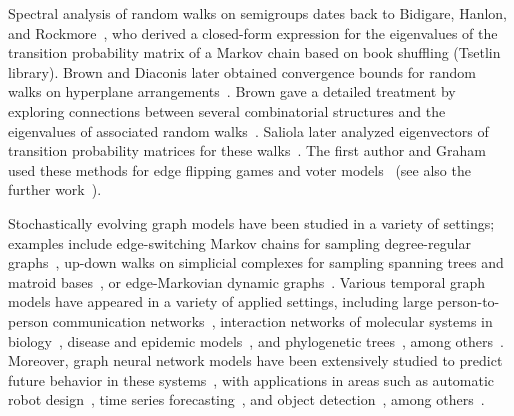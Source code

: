 \documentclass[11pt,a4paper]{article}
\begin{document}

Spectral analysis of random walks on semigroups dates back to Bidigare, Hanlon, and Rockmore~\cite{bidigare1999combinatorial}, who derived a closed-form expression for the eigenvalues of the transition probability matrix of a Markov chain based on book shuffling (Tsetlin library). Brown and Diaconis later obtained convergence bounds for random walks on hyperplane arrangements~\cite{brown1998random}. Brown gave a detailed treatment by exploring connections between several combinatorial structures and the eigenvalues of associated random walks~\cite{brownSemigroupsRingsMarkov2000}. Saliola later analyzed eigenvectors of transition probability matrices for these walks~\cite{saliola2012eigenvectors}. The first author and Graham used these methods for edge flipping games and voter models~\cite{chungEdgeFlippingGraphs2012} (see also the further work~\cite{butlerEdgeFlippingComplete2015,demirci2023mixing,chung2012hypergraph}).

Stochastically evolving graph models have been studied in a variety of settings; examples include edge-switching Markov chains for sampling degree-regular graphs~\cite{cooper2007sampling}, up-down walks on simplicial complexes for sampling spanning trees and matroid bases~\cite{anari2019log}, or edge-Markovian dynamic graphs~\cite{clementi2008flooding, akrida2020fast}. Various temporal graph models have appeared in a variety of applied settings, including large person-to-person communication networks~\cite{sekaraFundamentalStructuresDynamic2016}, interaction networks of molecular systems in biology~\cite{przytyckaDynamicInteractomeIts2010}, disease and epidemic models~\cite{pareEpidemicProcessesTimeVarying2018}, and phylogenetic trees~\cite{bienvenuMoranForest2021, durrettProbabilityModelsDNA2002}, among others~\cite{michailIntroductionTemporalGraphs2016, aggarwalEvolutionaryNetworkAnalysis2014, holmeTemporalNetworks2012}. Moreover, graph neural network models have been extensively studied to predict future behavior in these systems~\cite{wu2020evonet}, with applications in areas such as automatic robot design~\cite{wang2018neural}, time series forecasting~\cite{spadon2021pay}, and object detection~\cite{xu2022novel}, among others~\cite{skardingFoundationsModelingDynamic2021a}.
\end{document}
